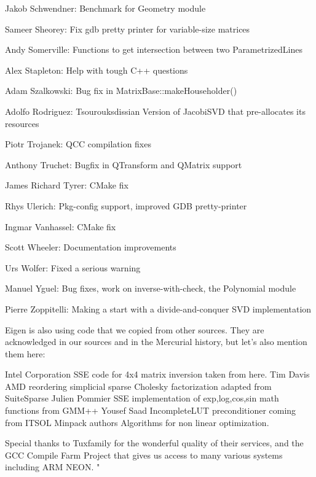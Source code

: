 Jakob Schwendner:  Benchmark for Geometry module  

Sameer Sheorey:  Fix gdb pretty printer for variable-size matrices  

Andy Somerville:  Functions to get intersection between two ParametrizedLines  

Alex Stapleton:  Help with tough C++ questions  

Adam Szalkowski:  Bug fix in MatrixBase::makeHouseholder()  

Adolfo Rodriguez: Tsourouksdissian  Version of JacobiSVD that pre-allocates its resources  

Piotr Trojanek:  QCC compilation fixes  

Anthony Truchet:  Bugfix in QTransform and QMatrix support  

James Richard Tyrer:  CMake fix  

Rhys Ulerich:  Pkg-config support, improved GDB pretty-printer  

Ingmar Vanhassel:  CMake fix  

Scott Wheeler:  Documentation improvements  

Urs Wolfer:  Fixed a serious warning  

Manuel Yguel:  Bug fixes, work on inverse-with-check, the Polynomial module  

Pierre Zoppitelli:  Making a start with a divide-and-conquer SVD implementation  

\vpara
Eigen is also using code that we copied from other sources. They are acknowledged in our sources and in the Mercurial history, but let's also mention them here: 

\vpara
Intel Corporation  SSE code for 4x4 matrix inversion taken from here.  
Tim Davis  AMD reordering simplicial sparse Cholesky factorization adapted from SuiteSparse  
Julien Pommier  SSE implementation of exp,log,cos,sin math functions from GMM++  
Yousef Saad  IncompleteLUT preconditioner coming from ITSOL  
Minpack authors  Algorithms for non linear optimization.  

\vpara
Special thanks to Tuxfamily for the wonderful quality of their services, and the GCC Compile Farm Project that gives us access to many various systems including ARM NEON. "


%
%
%



